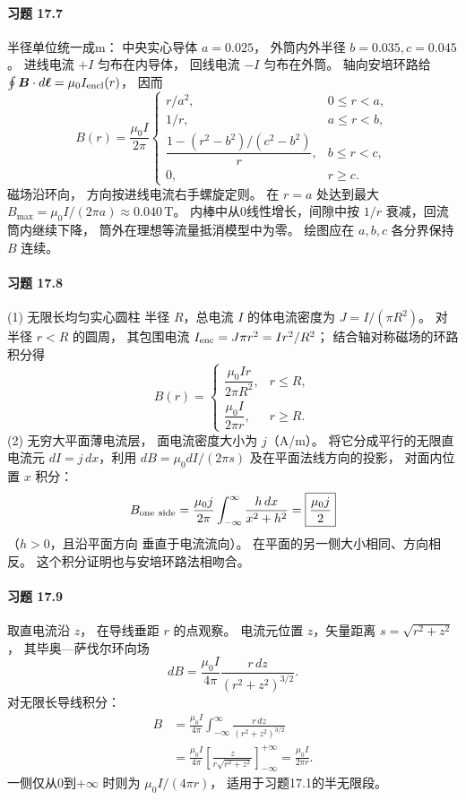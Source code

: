 \paragraph{习题 17.7}
半径单位统一成m：
中央实心导体 \(a=0.025\)，
外筒内外半径 \(b=0.035,c=0.045\)。
进线电流 \(+I\) 匀布在内导体，
回线电流 \(-I\) 匀布在外筒。
轴向安培环路给
\(\oint\boldsymbol B\cdot d\boldsymbol\ell
 =\mu_0I_{\rm encl}(r)\)，
因而
\[
 \boxed{B(r)=\frac{\mu_0I}{2\pi}
 \begin{cases}
 r/a^2,&0\le r<a,\\
 1/r,&a\le r<b,\\
 \dfrac{1-(r^2-b^2)/(c^2-b^2)}r,
   &b\le r<c,\\
 0,&r\ge c.
 \end{cases}}
\]
磁场沿环向，
方向按进线电流右手螺旋定则。
在 \(r=a\) 处达到最大
\(B_{\max}=\mu_0I/(2\pi a)
 \approx0.040\,\mathrm T\)。
内棒中从0线性增长，间隙中按 \(1/r\)
衰减，回流筒内继续下降，
筒外在理想等流量抵消模型中为零。
绘图应在 \(a,b,c\) 各分界保持 \(B\) 连续。

\paragraph{习题 17.8}
(1) 无限长均匀实心圆柱
半径 \(R\)，总电流 \(I\)
的体电流密度为
\(J=I/(\pi R^2)\)。
对半径 \(r<R\) 的圆周，
其包围电流
\(I_{\rm enc}=J\pi r^2=Ir^2/R^2\)；
结合轴对称磁场的环路积分得
\[
 \boxed{B(r)=
 \begin{cases}
 \dfrac{\mu_0Ir}{2\pi R^2},&r\le R,\\
 \dfrac{\mu_0I}{2\pi r},&r\ge R.
 \end{cases}}
\]
(2) 无穷大平面薄电流层，
面电流密度大小为 \(j\)（A/m）。
将它分成平行的无限直电流元
\(dI=j\,dx\)，利用
\(dB=\mu_0dI/(2\pi s)\)
及在平面法线方向的投影，
对面内位置 \(x\) 积分：
\[
 B_{\rm one\ side}
 =\frac{\mu_0j}{2\pi}
 \int_{-\infty}^{\infty}
 \frac{h\,dx}{x^2+h^2}
 =\boxed{\frac{\mu_0j}{2}}
\]
（\(h>0\)，且沿平面方向
垂直于电流流向）。
在平面的另一侧大小相同、方向相反。
这个积分证明也与安培环路法相吻合。

\paragraph{习题 17.9}
取直电流沿 \(z\)，
在导线垂距 \(r\) 的点观察。
电流元位置 \(z\)，矢量距离
\(s=\sqrt{r^2+z^2}\)，
其毕奥—萨伐尔环向场
\[
 dB=\frac{\mu_0I}{4\pi}
 \frac{r\,dz}{(r^2+z^2)^{3/2}}.
\]
对无限长导线积分：
\[
 \begin{aligned}
 B&=\frac{\mu_0I}{4\pi}
 \int_{-\infty}^{\infty}
 \frac{r\,dz}{(r^2+z^2)^{3/2}}\\
 &=\frac{\mu_0I}{4\pi}
 \left[\frac{z}{r\sqrt{r^2+z^2}}\right]_{-\infty}^{+\infty}
 =\boxed{\frac{\mu_0I}{2\pi r}}.
 \end{aligned}
\]
一侧仅从0到+\(\infty\) 时则为
\(\mu_0I/(4\pi r)\)，
适用于习题17.1的半无限段。

